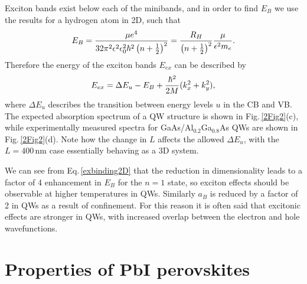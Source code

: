 Exciton bands exist below each of the minibands, and in order to find $E_B$ we use the results for a hydrogen atom in 2D, such that
\begin{equation}
\centering
E_B =\frac{\mu e^4}{32\pi^2\epsilon^2\epsilon_0^2\hbar^2\left(n+\frac{1}{2}\right)^2} = \frac{R_H}{\left(n+\frac{1}{2}\right)^2}\frac{\mu}{\epsilon^2 m_e} .
\label{exbinding2D}
\end{equation}
Therefore the energy of the exciton bands $E_{ex}$ can be described by
\begin{equation}
\centering
E_{ex} = \Delta E_u - E_B + \frac{\hbar^2}{2M}(k_x^2+k_y^2) ,
\label{exenergy2D}
\end{equation}
where $\Delta E_u$ describes the transition between energy levels $u$ in the CB and VB. The expected absorption spectrum of a QW structure is shown in Fig.\,\ref{2Fig2}(c), while experimentally measured spectra for GaAs/Al$_{0.2}$Ga$_{0.8}$As QWs are shown in Fig.\,\ref{2Fig2}(d). Note how the change in $L$ affects the allowed $\Delta E_u$, with the $L=400$\,nm %
case %
essentially behaving as a 3D system.

We can see from Eq.\,\ref{exbinding2D} that the reduction in dimensionality leads to a factor of 4 enhancement in $E_B$ for the $n=1$ state, so exciton effects should be observable at higher temperatures in QWs. Similarly $a_B$ is reduced by a factor of 2 in QWs as a result of confinement. For this reason it is often said that excitonic effects are stronger in QWs, with increased overlap between the electron and hole wavefunctions.

\section{Properties of PbI perovskites}
